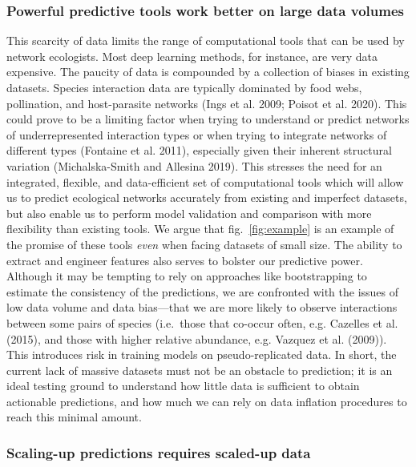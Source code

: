 \documentclass[10pt,oneside]{article}
\begin{document}
\hypertarget{powerful-predictive-tools-work-better-on-large-data-volumes}{%
\subsubsection{Powerful predictive tools work better on large data
volumes}\label{powerful-predictive-tools-work-better-on-large-data-volumes}}

This scarcity of data limits the range of computational tools that can
be used by network ecologists. Most deep learning methods, for instance,
are very data expensive. The paucity of data is compounded by a
collection of biases in existing datasets. Species interaction data are
typically dominated by food webs, pollination, and host-parasite
networks (Ings et al. 2009; Poisot et al. 2020). This could prove to be
a limiting factor when trying to understand or predict networks of
underrepresented interaction types or when trying to integrate networks
of different types (Fontaine et al. 2011), especially given their
inherent structural variation (Michalska-Smith and Allesina 2019). This
stresses the need for an integrated, flexible, and data-efficient set of
computational tools which will allow us to predict ecological networks
accurately from existing and imperfect datasets, but also enable us to
perform model validation and comparison with more flexibility than
existing tools. We argue that fig.~\ref{fig:example} is an example of
the promise of these tools \emph{even} when facing datasets of small
size. The ability to extract and engineer features also serves to
bolster our predictive power. Although it may be tempting to rely on
approaches like bootstrapping to estimate the consistency of the
predictions, we are confronted with the issues of low data volume and
data bias---that we are more likely to observe interactions between some
pairs of species (i.e.~those that co-occur often, e.g. Cazelles et al.
(2015), and those with higher relative abundance, e.g. Vazquez et al.
(2009)). This introduces risk in training models on pseudo-replicated
data. In short, the current lack of massive datasets must not be an
obstacle to prediction; it is an ideal testing ground to understand how
little data is sufficient to obtain actionable predictions, and how much
we can rely on data inflation procedures to reach this minimal amount.

\hypertarget{scaling-up-predictions-requires-scaled-up-data}{%
\subsubsection{Scaling-up predictions requires scaled-up
data}\label{scaling-up-predictions-requires-scaled-up-data}}
\end{document}
